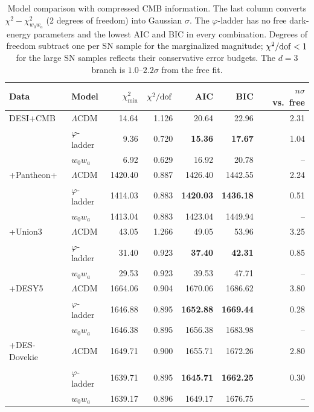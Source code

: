 \documentclass[11pt]{article}
\theoremstyle{definition}
\theoremstyle{remark}
\newcommand{\gr}{\varphi}
\newcommand{\LCDM}{$\Lambda$CDM}
\begin{document}
\begin{table}[t]
\centering
\small
\begin{tabular}{llrrrrr}
\toprule
Data & Model & $\chi^2_{\min}$ & $\chi^2/{\rm dof}$ & AIC & BIC & $n\sigma$ vs.\ free \\
\midrule
DESI+CMB & \LCDM & 14.64 & 1.126 & 20.64 & 22.96 & 2.31 \\
 & $\gr$-ladder & 9.36 & 0.720 & \textbf{15.36} & \textbf{17.67} & 1.04 \\
 & $w_0w_a$ & 6.92 & 0.629 & 16.92 & 20.78 & -- \\
\midrule
+Pantheon+ & \LCDM & 1420.40 & 0.887 & 1426.40 & 1442.55 & 2.24 \\
 & $\gr$-ladder & 1414.03 & 0.883 & \textbf{1420.03} & \textbf{1436.18} & 0.51 \\
 & $w_0w_a$ & 1413.04 & 0.883 & 1423.04 & 1449.94 & -- \\
\midrule
+Union3 & \LCDM & 43.05 & 1.266 & 49.05 & 53.96 & 3.25 \\
 & $\gr$-ladder & 31.40 & 0.923 & \textbf{37.40} & \textbf{42.31} & 0.85 \\
 & $w_0w_a$ & 29.53 & 0.923 & 39.53 & 47.71 & -- \\
\midrule
+DESY5 & \LCDM & 1664.06 & 0.904 & 1670.06 & 1686.62 & 3.80 \\
 & $\gr$-ladder & 1646.88 & 0.895 & \textbf{1652.88} & \textbf{1669.44} & 0.28 \\
 & $w_0w_a$ & 1646.38 & 0.895 & 1656.38 & 1683.98 & -- \\
\midrule
+DES-Dovekie & \LCDM & 1649.71 & 0.900 & 1655.71 & 1672.26 & 2.80 \\
 & $\gr$-ladder & 1639.71 & 0.895 & \textbf{1645.71} & \textbf{1662.25} & 0.30 \\
 & $w_0w_a$ & 1639.17 & 0.896 & 1649.17 & 1676.75 & -- \\
\bottomrule
\end{tabular}
\caption{Model comparison with compressed CMB information. The last column converts $\chi^2 - \chi^2_{w_0w_a}$ (2 degrees of freedom) into Gaussian $\sigma$. The $\gr$-ladder has no free dark-energy parameters and the lowest AIC and BIC in every combination. Degrees of freedom subtract one per SN sample for the marginalized magnitude; $\chi^2/{\rm dof} < 1$ for the large SN samples reflects their conservative error budgets. The $d = 3$ branch is $1.0$--$2.2\sigma$ from the free fit.}
\label{tab:fits}
\end{table}
\end{document}
